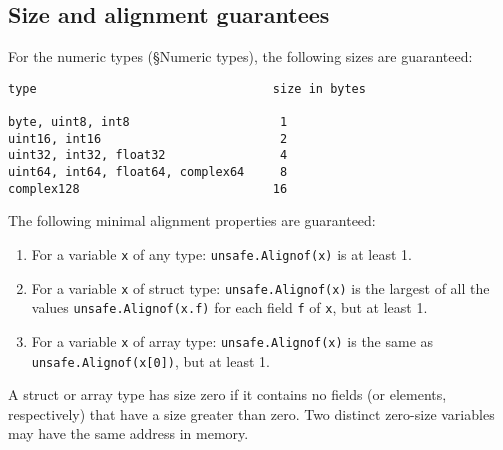\subsection*{Size and alignment guarantees}

For the numeric types (§Numeric types), the
following sizes are guaranteed:

\begin{Verbatim}[frame=single]
type                                 size in bytes

byte, uint8, int8                     1
uint16, int16                         2
uint32, int32, float32                4
uint64, int64, float64, complex64     8
complex128                           16
\end{Verbatim}

The following minimal alignment properties are guaranteed:

\begin{enumerate}
\item
  For a variable \texttt{x} of any type: \texttt{unsafe.Alignof(x)} is
  at least 1.
\item
  For a variable \texttt{x} of struct type: \texttt{unsafe.Alignof(x)}
  is the largest of all the values \texttt{unsafe.Alignof(x.f)} for each
  field \texttt{f} of \texttt{x}, but at least 1.
\item
  For a variable \texttt{x} of array type: \texttt{unsafe.Alignof(x)} is
  the same as \texttt{unsafe.Alignof(x{[}0{]})}, but at least 1.
\end{enumerate}

A struct or array type has size zero if it contains no fields (or
elements, respectively) that have a size greater than zero. Two distinct
zero-size variables may have the same address in memory.
